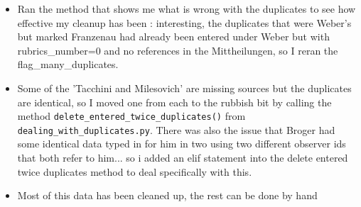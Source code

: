 \documentclass[12pt]{article}
\begin{document}
\begin{itemize}
    \item Ran the method that shows me what is wrong with the duplicates to see how effective my cleanup has been : interesting, the duplicates that were Weber's but marked Franzenau had already been entered under Weber but with rubrics\_number=0 and no references in the Mittheilungen, so I reran the flag\_many\_duplicates.
    \item Some of the 'Tacchini and Milesovich' are missing sources but the duplicates are identical, so I moved one from each to the rubbish bit by calling the method \texttt{delete\_entered\_twice\_duplicates()} from \texttt{dealing\_with\_duplicates.py}. There was also the issue that Broger had some identical data typed in for him in two using two different observer ids that both refer to him... so i added an elif statement into the delete entered twice duplicates method to deal specifically with this.
    \item Most of this data has been cleaned up, the rest can be done by hand
\end{itemize}
    
\end{document}
